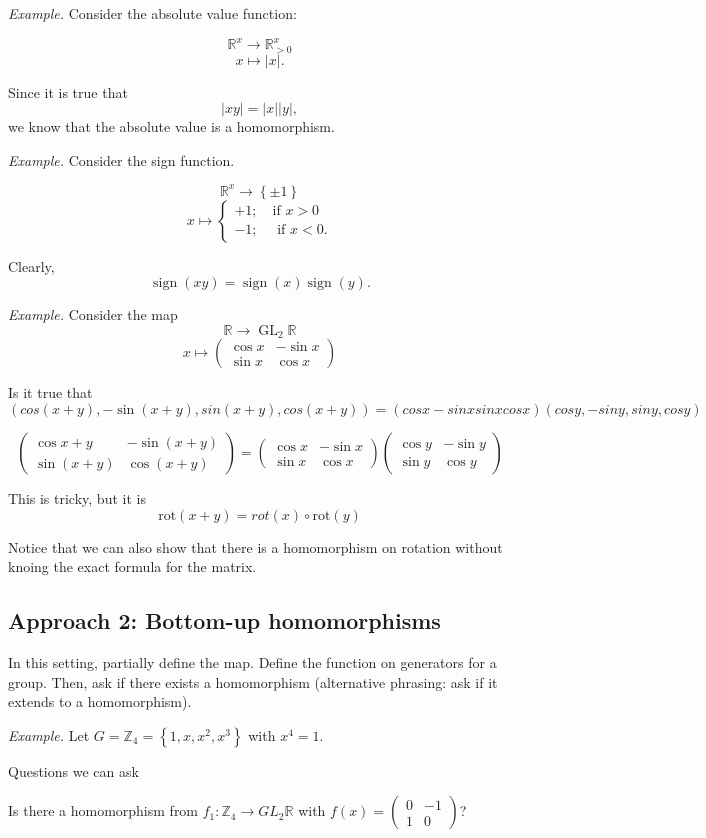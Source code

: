 \documentclass[12pt]{article}
\newcommand{\RR}{\mathbb{R}}
\DeclareMathOperator{\sign}{sign}
\DeclareMathOperator{\GL}{GL}
\newcommand*{\mat}[1]{\begin{pmatrix}#1\end{pmatrix}}
\def\ZZ{\mathbb{Z}}
\def\rot{\text{rot}}
\newcommand*{\mat}[1]{\begin{pmatrix}#1\end{pmatrix}}
\begin{document}
{\it Example.} Consider the absolute value function:

\[
  \RR^x \to \RR_{> 0}^{x}
\]
\[
  x \mapsto |x|.
\]

Since it is true that
\[
  |x y| = |x| |y|,
\]
we know that the absolute value is a homomorphism.

{\it Example.} Consider the sign function.

\[
  \RR^x \to \left\{ \pm 1 \right\}
\]
\[
  x \mapsto
  \begin{cases}
    +1; \quad \text{if } x > 0 \\
    -1; \quad \text{ if } x < 0.
  \end{cases}
\]

Clearly,
\[
  \sign (xy) = \sign (x) \sign (y).
\]

{\it Example.} Consider the map
\[
  \RR \to \GL_2 \RR
\]
\[
  x \mapsto \mat{\cos x & - \sin x \\ \sin x & \cos x}
\]

Is it true that
\[
  (cos (x+y), - \sin (x+ y), sin (x+y), cos (x+y)) = (cos x -sin x sin x cos x) (cos y, -sin y, sin y, cos y)
\]

\[
  \mat{\cos x+y & - \sin (x+y) \\ \sin (x+y) & \cos (x+y)} = \mat{\cos x & - \sin x \\ \sin x & \cos x} \mat{\cos y & - \sin y \\ \sin y & \cos y}
\]

This is tricky, but it is
\[
  \text{rot}(x+y) = rot(x) \circ \rot (y)
\]

Notice that we can also show that there is a homomorphism on rotation without knoing the exact formula for the matrix.

\subsection{Approach 2: Bottom-up homomorphisms}

In this setting, partially define the map.  Define the function on generators for a group.  Then, ask if there exists a homomorphism (alternative phrasing: ask if it extends to a homomorphism).

{\it Example.} Let $G = \ZZ_4 = \left\{ 1, x, x^2, x^3 \right\}$ with $x^4 = 1$.

Questions we can ask

Is there a homomorphism from $f_1: \ZZ_4 \to GL_2 \RR$ with $f(x) = \mat{0 & -1 \\ 1 & 0}$?
\end{document}
